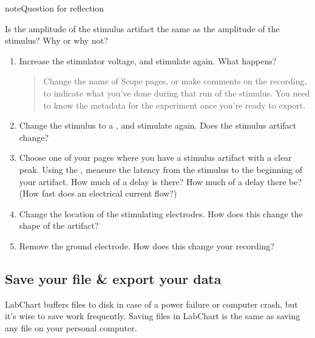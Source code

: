 \documentclass[letterpaper,10pt,english]{jupyterBook}
\begin{document}
\begin{sphinxadmonition}{note}{Question for reflection}

\sphinxAtStartPar
Is the amplitude of the stimulus artifact the same as the amplitude of the stimulus? Why or why not?
\end{sphinxadmonition}
\begin{enumerate}
%
\setcounter{enumi}{5}
\item {} 
\sphinxAtStartPar
Increase the stimulator voltage, and stimulate again. What happens?
\begin{quote}

\sphinxAtStartPar
{} Change the name of Scope pages, or make comments on the recording, to indicate what you’ve done during that run of the stimulus. You need to know the metadata for the experiment once you’re ready to export.
\end{quote}

\item {} 
\sphinxAtStartPar
Change the stimulus to a , and stimulate again. Does the stimulus artifact change?

\item {} 
\sphinxAtStartPar
Choose one of your pages where you have a stimulus artifact with a clear peak. Using the , measure the latency from the stimulus to the beginning of your artifact. How much of a delay is there? How much of a delay  there be? (How fast does an electrical current flow?)

\item {} 
\sphinxAtStartPar
Change the location of the stimulating electrodes. How does this change the shape of the artifact?

\item {} 
\sphinxAtStartPar
Remove the ground electrode. How does this change your recording?

\end{enumerate}


\subsection{Save your file \& export your data}
\label{\detokenize{StringNervousSystems:save-your-file-export-your-data}}
\sphinxAtStartPar
LabChart buffers files to disk in case of a power failure or computer crash, but it’s wise to save work frequently. Saving files in LabChart is the same as saving any file on your personal computer.
\end{document}

